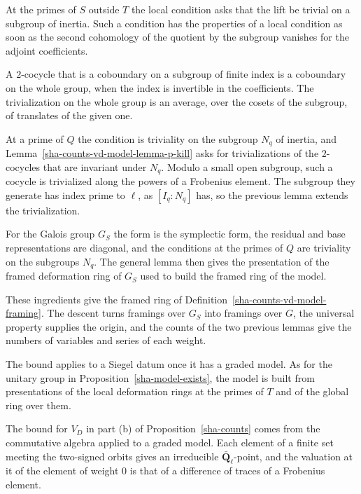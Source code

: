 At the primes of $S$ outside $T$ the local condition asks that the lift be trivial on a subgroup of inertia. Such a condition has the properties of a local condition as soon as the second cohomology of the quotient by the subgroup vanishes for the adjoint coefficients.

A $2$-cocycle that is a coboundary on a subgroup of finite index is a coboundary on the whole group, when the index is invertible in the coefficients. The trivialization on the whole group is an average, over the cosets of the subgroup, of translates of the given one.

At a prime of $Q$ the condition is triviality on the subgroup $N_q$ of inertia, and Lemma~\ref{sha-counts-vd-model-lemma-p-kill} asks for trivializations of the $2$-cocycles that are invariant under $N_q$. Modulo a small open subgroup, such a cocycle is trivialized along the powers of a Frobenius element. The subgroup they generate has index prime to $\ell$, as $[I_q:N_q]$ has, so the previous lemma extends the trivialization.

For the Galois group $G_S$ the form is the symplectic form, the residual and base representations are diagonal, and the conditions at the primes of $Q$ are triviality on the subgroups $N_q$. The general lemma then gives the presentation of the framed deformation ring of $G_S$ used to build the framed ring of the model.

These ingredients give the framed ring of Definition~\ref{sha-counts-vd-model-framing}. The descent turns framings over $G_S$ into framings over $G$, the universal property supplies the origin, and the counts of the two previous lemmas give the numbers of variables and series of each weight.

The bound applies to a Siegel datum once it has a graded model. As for the unitary group in Proposition~\ref{sha-model-exists}, the model is built from presentations of the local deformation rings at the primes of $T$ and of the global ring over them.

The bound for $V_D$ in part (b) of Proposition~\ref{sha-counts} comes from the commutative algebra applied to a graded model. Each element of a finite set meeting the two-signed orbits gives an irreducible $\bar{\mathbf Q}_\ell$-point, and the valuation at it of the element of weight $0$ is that of a difference of traces of a Frobenius element.

